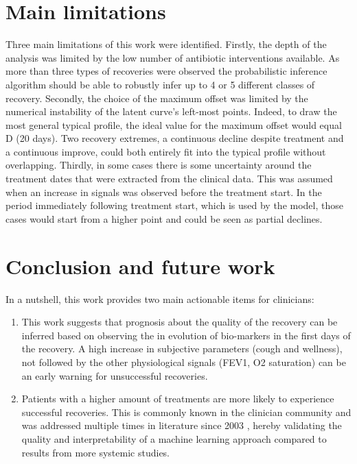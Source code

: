 \section{Main limitations}
Three main limitations of this work were identified. Firstly, the depth of the analysis was limited by the low number of antibiotic interventions available. As more than three types of recoveries were observed the probabilistic inference algorithm should be able to robustly infer up to 4 or 5 different classes of recovery. Secondly, the choice of the maximum offset was limited by the numerical instability of the latent curve's left-most points. Indeed, to draw the most general typical profile, the ideal value for the maximum offset would equal D (20 days). Two recovery extremes, a continuous decline despite treatment and a continuous improve, could both entirely fit into the typical profile without overlapping. Thirdly, in some cases there is some uncertainty around the treatment dates that were extracted from the clinical data. This was assumed when an increase in signals was observed before the treatment start. In the period immediately following treatment start, which is used by the model, those cases would start from a higher point and could be seen as partial declines.


\section{Conclusion and future work}
In a nutshell, this work provides two main actionable items for clinicians:
\begin{enumerate}
    \item This work suggests that prognosis about the quality of the recovery can be inferred based on observing the in evolution of bio-markers in the first days of the recovery. A high increase in subjective parameters (cough and wellness), not followed by the other physiological signals (FEV1, O2 saturation) can be an early warning for unsuccessful recoveries.
    \item Patients with a higher amount of treatments are more likely to experience successful recoveries. This is commonly known in the clinician community and was addressed multiple times in literature since 2003 \cite{giron_2021}, hereby validating the quality and interpretability of a machine learning approach compared to results from more systemic studies.
\end{enumerate}

